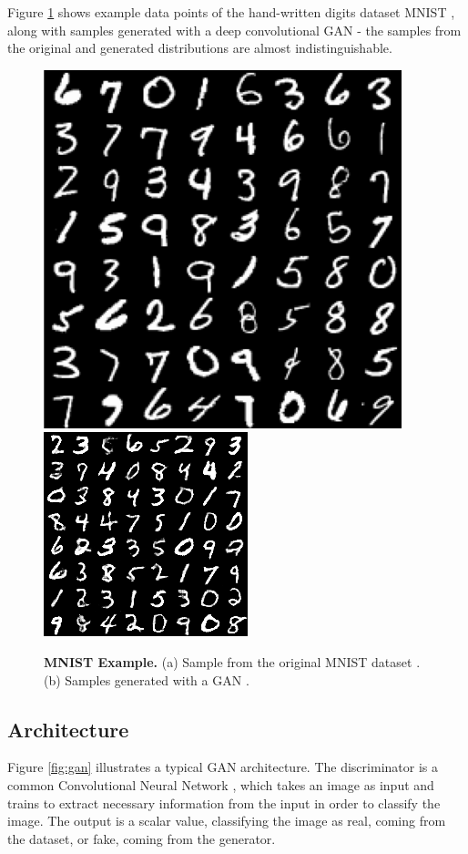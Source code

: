 \documentclass[12pt]{report}
\begin{document}
Figure \ref{fig:mnist} shows example data points of the hand-written digits dataset MNIST \cite{lecun_mnist_nodate}, along with samples generated with a deep convolutional GAN \cite{kim_dcgan-tensorflow_2018} - the samples from the original and generated distributions are almost indistinguishable.

\begin{figure}[h]
\centering
{}
{\includegraphics[width=.35\linewidth]{02_background/mnist_orig}}\hspace{0.5cm}
{\includegraphics[width=.35\linewidth]{02_background/mnist_dcgan}}
\caption{\label{fig:mnist} \textbf{MNIST Example.}
(a) Sample from the original MNIST dataset \cite{lecun_mnist_nodate}. (b) Samples generated with a GAN \cite{kim_dcgan-tensorflow_2018}.}
\end{figure}

\subsection{Architecture}

Figure \ref{fig:gan} illustrates a typical GAN architecture. The discriminator is a common Convolutional Neural Network \cite{lecun_convolutional_1995}, which takes an image as input and trains to extract necessary information from the input in order to classify the image. The output is a scalar value, classifying the image as real, coming from the dataset, or fake, coming from the generator.
\end{document}
